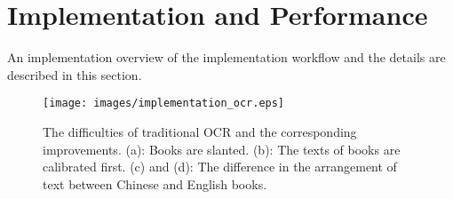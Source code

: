 \section{Implementation and Performance}
\label{sec:implementation}

An implementation overview of the implementation workflow
and the details are described in this section.


%


\begin{figure}[htp]
    \centering
    \texttt{[image: images/implementation\_ocr.eps]}
    \caption{
        The difficulties of traditional OCR and the corresponding improvements.
        (a): Books are slanted.
        (b): The texts of books are calibrated first.
        (c) and (d): The difference in the arrangement of text between Chinese and English books.
    }
    \label{fig:implementation_ocr}
\end{figure}


